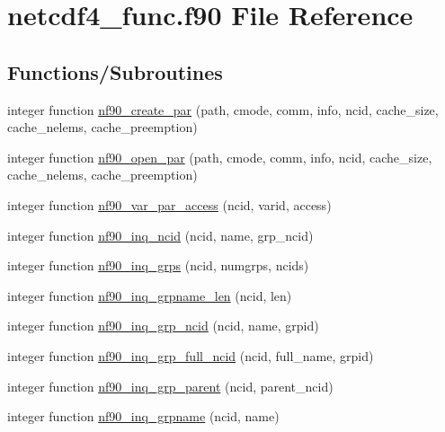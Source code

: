 \hypertarget{netcdf4__func_8f90}{}\section{netcdf4\+\_\+func.\+f90 File Reference}
\label{netcdf4__func_8f90}
\subsection*{Functions/\+Subroutines}
\begin{DoxyCompactItemize}
\item 
integer function \hyperlink{netcdf4__func_8f90_ac93652f3ab69d6782ceee82f91633329}{nf90\+\_\+create\+\_\+par} (path, cmode, comm, info, ncid, cache\+\_\+size, cache\+\_\+nelems, cache\+\_\+preemption)
\item 
integer function \hyperlink{netcdf4__func_8f90_a74a7fd4b0100efed1931cd05a01ffc49}{nf90\+\_\+open\+\_\+par} (path, cmode, comm, info, ncid, cache\+\_\+size, cache\+\_\+nelems, cache\+\_\+preemption)
\item 
integer function \hyperlink{netcdf4__func_8f90_a57224e8f3d445359fbbb405d796445e6}{nf90\+\_\+var\+\_\+par\+\_\+access} (ncid, varid, access)
\item 
integer function \hyperlink{netcdf4__func_8f90_a038524b4eab7c7b56fd9941d521306b4}{nf90\+\_\+inq\+\_\+ncid} (ncid, name, grp\+\_\+ncid)
\item 
integer function \hyperlink{netcdf4__func_8f90_a3281b7e51942b73049a399236b009293}{nf90\+\_\+inq\+\_\+grps} (ncid, numgrps, ncids)
\item 
integer function \hyperlink{netcdf4__func_8f90_a7ee0183b26ec2642a5ab0542ec26d0ad}{nf90\+\_\+inq\+\_\+grpname\+\_\+len} (ncid, len)
\item 
integer function \hyperlink{netcdf4__func_8f90_a93554ba4b39b871b192865fed0001bd7}{nf90\+\_\+inq\+\_\+grp\+\_\+ncid} (ncid, name, grpid)
\item 
integer function \hyperlink{netcdf4__func_8f90_a13f802e53deee92d2dff2451e584d162}{nf90\+\_\+inq\+\_\+grp\+\_\+full\+\_\+ncid} (ncid, full\+\_\+name, grpid)
\item 
integer function \hyperlink{netcdf4__func_8f90_a644bee39a527ee42b933acfeec637ad8}{nf90\+\_\+inq\+\_\+grp\+\_\+parent} (ncid, parent\+\_\+ncid)
\item 
integer function \hyperlink{netcdf4__func_8f90_ab83e8bc007b27e4710c4ffdc8e43ded8}{nf90\+\_\+inq\+\_\+grpname} (ncid, name)
\item 

\end{DoxyCompactItemize}
